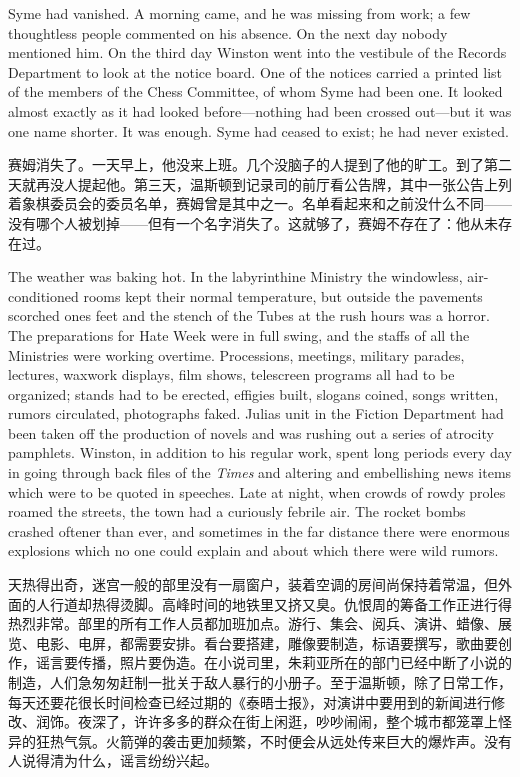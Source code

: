 \begin{paracol}{2}
\switchcolumn*

Syme had vanished. A morning came, and he was missing from work; a few
thoughtless people commented on his absence. On the next day nobody
mentioned him. On the third day Winston went into the vestibule of the
Records Department to look at the notice board. One of the notices
carried a printed list of the members of the Chess Committee, of whom
Syme had been one. It looked almost exactly as it had looked
before---nothing had been crossed out---but it was one name shorter. It
was enough. Syme had ceased to exist; he had never existed.

\switchcolumn

赛姆消失了。一天早上，他没来上班。几个没脑子的人提到了他的旷工。到了第二天就再没人提起他。第三天，温斯顿到记录司的前厅看公告牌，其中一张公告上列着象棋委员会的委员名单，赛姆曾是其中之一。名单看起来和之前没什么不同——没有哪个人被划掉——但有一个名字消失了。这就够了，赛姆不存在了：他从未存在过。

\switchcolumn*

The weather was baking hot. In the labyrinthine Ministry the windowless,
air-conditioned rooms kept their normal temperature, but outside the
pavements scorched one\textquotesingle s feet and the stench of the
Tubes at the rush hours was a horror. The preparations for Hate Week
were in full swing, and the staffs of all the Ministries were working
overtime. Processions, meetings, military parades, lectures, waxwork
displays, film shows, telescreen programs all had to be organized;
stands had to be erected, effigies built, slogans coined, songs written,
rumors circulated, photographs faked. Julia\textquotesingle s unit in
the Fiction Department had been taken off the production of novels and
was rushing out a series of atrocity pamphlets. Winston, in addition to
his regular work, spent long periods every day in going through back
files of the \emph{Times} and altering and embellishing news items which
were to be quoted in speeches. Late at night, when crowds of rowdy
proles roamed the streets, the town had a curiously febrile air. The
rocket bombs crashed oftener than ever, and sometimes in the far
distance there were enormous explosions which no one could explain and
about which there were wild rumors.

\switchcolumn

天热得出奇，迷宫一般的部里没有一扇窗户，装着空调的房间尚保持着常温，但外面的人行道却热得烫脚。高峰时间的地铁里又挤又臭。仇恨周的筹备工作正进行得热烈非常。部里的所有工作人员都加班加点。游行、集会、阅兵、演讲、蜡像、展览、电影、电屏，都需要安排。看台要搭建，雕像要制造，标语要撰写，歌曲要创作，谣言要传播，照片要伪造。在小说司里，朱莉亚所在的部门已经中断了小说的制造，人们急匆匆赶制一批关于敌人暴行的小册子。至于温斯顿，除了日常工作，每天还要花很长时间检查已经过期的《泰晤士报》，对演讲中要用到的新闻进行修改、润饰。夜深了，许许多多的群众在街上闲逛，吵吵闹闹，整个城市都笼罩上怪异的狂热气氛。火箭弹的袭击更加频繁，不时便会从远处传来巨大的爆炸声。没有人说得清为什么，谣言纷纷兴起。


\end{paracol}
